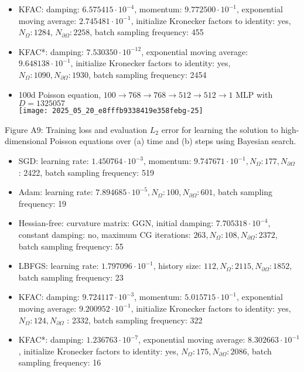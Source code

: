 \documentclass[10pt]{article}
\begin{document}
\begin{itemize}
  \item KFAC: damping: $6.575415 \cdot 10^{-4}$, momentum: $9.772500 \cdot 10^{-1}$, exponential moving average: $2.745481 \cdot 10^{-1}$, initialize Kronecker factors to identity: yes, $N_{\Omega}: 1284$, $N_{\partial \Omega}: 2258$, batch sampling frequency: 455
  \item KFAC*: damping: $7.530350 \cdot 10^{-12}$, exponential moving average: $9.648138 \cdot 10^{-1}$, initialize Kronecker factors to identity: yes, $N_{\Omega}: 1090, N_{\partial \Omega}: 1930$, batch sampling frequency: 2454
  \item 100d Poisson equation, $100 \rightarrow 768 \rightarrow 768 \rightarrow 512 \rightarrow 512 \rightarrow 1$ MLP with $D=1325057$\\
\texttt{[image: 2025\_05\_20\_e8fffb9338419e358febg-25]}
\end{itemize}

Figure A9: Training loss and evaluation $L_{2}$ error for learning the solution to high-dimensional Poisson equations over (a) time and (b) steps using Bayesian search.

\begin{itemize}
  \item SGD: learning rate: $1.450764 \cdot 10^{-3}$, momentum: $9.747671 \cdot 10^{-1}, N_{\Omega}: 177, N_{\partial \Omega}$ : 2422, batch sampling frequency: 519
  \item Adam: learning rate: $7.894685 \cdot 10^{-5}, N_{\Omega}: 100, N_{\partial \Omega}: 601$, batch sampling frequency: 19
  \item Hessian-free: curvature matrix: GGN, initial damping: $7.705318 \cdot 10^{-4}$, constant damping: no, maximum CG iterations: $263, N_{\Omega}: 108, N_{\partial \Omega}: 2372$, batch sampling frequency: 55
  \item LBFGS: learning rate: $1.797096 \cdot 10^{-1}$, history size: $112, N_{\Omega}: 2115, N_{\partial \Omega}: 1852$, batch sampling frequency: 23
  \item KFAC: damping: $9.724117 \cdot 10^{-3}$, momentum: $5.015715 \cdot 10^{-1}$, exponential moving average: $9.200952 \cdot 10^{-1}$, initialize Kronecker factors to identity: yes, $N_{\Omega}: 124, N_{\partial \Omega}$ : 2332, batch sampling frequency: 322
  \item KFAC*: damping: $1.236763 \cdot 10^{-7}$, exponential moving average: $8.302663 \cdot 10^{-1}$, initialize Kronecker factors to identity: yes, $N_{\Omega}: 175, N_{\partial \Omega}: 2086$, batch sampling frequency: 16
\end{itemize}
\end{document}

